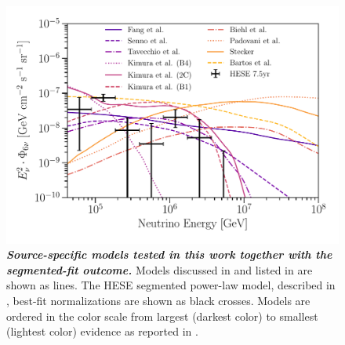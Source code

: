 \begin{figure}
	\centering
	\includegraphics[width=\linewidth]{figures/hese_paper/HESE_flux_with_ad_hoc_models}
	\internallinenumbers
	\caption{\textbf{\textit{Source-specific models tested in this work together with the segmented-fit outcome.}}
		Models discussed in  and listed in  are shown as lines.
		The HESE segmented power-law model, described in , best-fit normalizations are shown as black crosses.
		Models are ordered in the color scale from largest (darkest color) to smallest (lightest color) evidence as reported in .}
	\label{fig:source_models_fluxes}
\end{figure}

